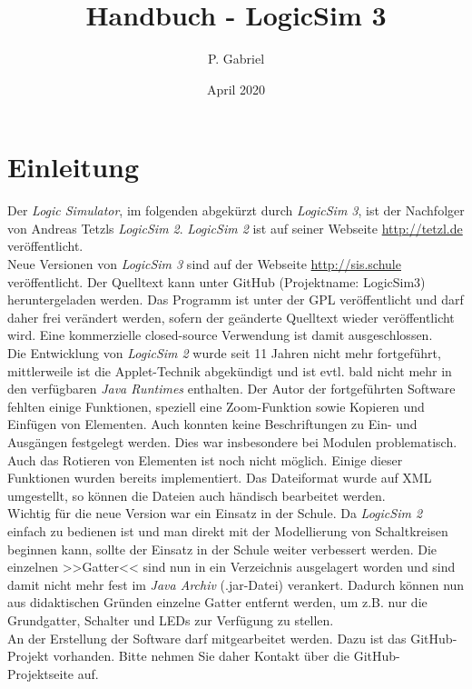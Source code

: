 \documentclass[12pt]{scrartcl}
\begin{document}
\newcommand{\lsN}{\textit{LogicSim 3}}
\newcommand{\lsA}{\textit{LogicSim 2}}


\title{Handbuch - LogicSim 3}
\author{P. Gabriel}
\date{April 2020}
\vspace*{-11mm}

\section{Einleitung}
Der \textit{Logic Simulator}, im folgenden abgekürzt durch \lsN{}, ist der Nachfolger von Andreas Tetzls \lsA{}. \lsA{} ist auf seiner Webseite \url{http://tetzl.de} veröffentlicht.\\

Neue Versionen von \lsN{} sind auf der Webseite \url{http://sis.schule} veröffentlicht. Der Quelltext kann unter GitHub (Projektname: LogicSim3) heruntergeladen werden. Das Programm ist unter der GPL veröffentlicht und darf daher frei verändert werden, sofern der geänderte Quelltext wieder veröffentlicht wird. Eine kommerzielle closed-source Verwendung ist damit ausgeschlossen.\\

Die Entwicklung von \lsA{} wurde seit 11 Jahren nicht mehr fortgeführt, mittlerweile ist die Applet-Technik abgekündigt und ist evtl. bald nicht mehr in den verfügbaren \textit{Java Runtimes} enthalten. Der Autor der fortgeführten Software fehlten einige Funktionen, speziell eine Zoom-Funktion sowie Kopieren und Einfügen von Elementen. Auch konnten keine Beschriftungen zu Ein- und Ausgängen festgelegt werden. Dies war insbesondere bei Modulen problematisch. Auch das Rotieren von Elementen ist noch nicht möglich. Einige dieser Funktionen wurden bereits implementiert. Das Dateiformat wurde auf XML umgestellt, so können die Dateien auch händisch bearbeitet werden.\\

Wichtig für die neue Version war ein Einsatz in der Schule. Da \lsA{} einfach zu bedienen ist und man direkt mit der Modellierung von Schaltkreisen beginnen kann, sollte der Einsatz in der Schule weiter verbessert werden. Die einzelnen >>Gatter<< sind nun in ein Verzeichnis ausgelagert worden und sind damit nicht mehr fest im \textit{Java Archiv} (.jar-Datei) verankert. Dadurch können nun aus didaktischen Gründen einzelne Gatter entfernt werden, um z.B. nur die Grundgatter, Schalter und LEDs zur Verfügung zu stellen.\\

An der Erstellung der Software darf mitgearbeitet werden. Dazu ist das GitHub-Projekt vorhanden. Bitte nehmen Sie daher Kontakt über die GitHub-Projektseite auf.\\
\end{document}
